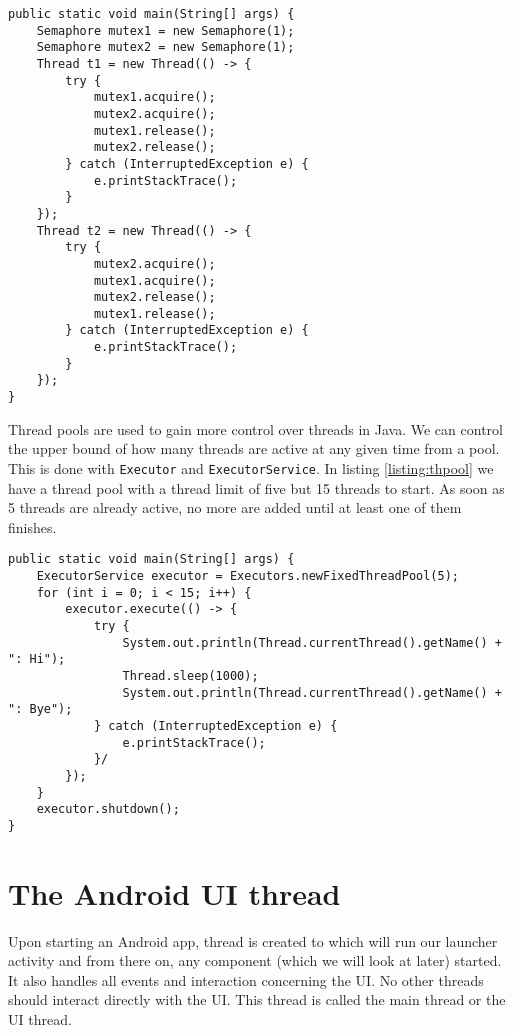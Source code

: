 \begin{lstlisting}[style=A_Java, caption={Deadlock}, label={listing:dlock}]
public static void main(String[] args) {
    Semaphore mutex1 = new Semaphore(1);
    Semaphore mutex2 = new Semaphore(1);
    Thread t1 = new Thread(() -> {
        try {
            mutex1.acquire();
            mutex2.acquire();
            mutex1.release();
            mutex2.release();
        } catch (InterruptedException e) {
            e.printStackTrace();
        }
    });
    Thread t2 = new Thread(() -> {
        try {
            mutex2.acquire();
            mutex1.acquire();
            mutex2.release();
            mutex1.release();
        } catch (InterruptedException e) {
            e.printStackTrace();
        }
    });
}
\end{lstlisting}

Thread pools are used to gain more control over threads in Java. We can control the upper bound of how many threads are active at any given time from a pool. This is done with \texttt{Executor} and \texttt{ExecutorService}. In listing \ref{listing:thpool} we have a thread pool with a thread limit of five but 15 threads to start. As soon as 5 threads are already active, no more are added until at least one of them finishes.

\begin{lstlisting}[style=A_Java, caption={Thread pool}, label={listing:thpool}]
public static void main(String[] args) {
    ExecutorService executor = Executors.newFixedThreadPool(5);
    for (int i = 0; i < 15; i++) {
        executor.execute(() -> {
            try {
                System.out.println(Thread.currentThread().getName() + ": Hi");
                Thread.sleep(1000);
                System.out.println(Thread.currentThread().getName() + ": Bye");
            } catch (InterruptedException e) {
                e.printStackTrace();
            }/
        });
    }
    executor.shutdown();
}
\end{lstlisting}

\section{The Android UI thread}
Upon starting an Android app, thread is created to which will run our launcher activity and from there on, any component (which we will look at later) started. It also handles all events and interaction concerning the UI. No other threads should interact directly with the UI. This thread is called the main thread or the UI thread.\\

